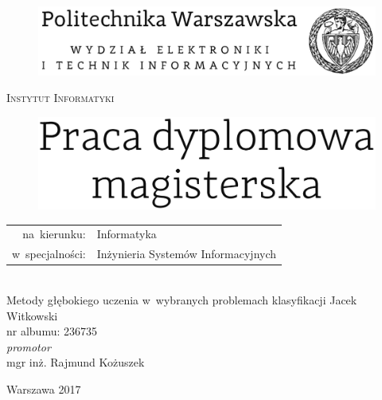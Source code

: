 \documentclass[12pt,a4paper,twoside]{report}
\begin{document}
\begin{titlepage}
  \begin{center}

    \begin{figure}[H]
	\centering
	\includegraphics[width=0.8\linewidth]{img/elka-logo.png}
    \end{figure}


    \textsc{\Large Instytut Informatyki}\\[4.0cm]

    \begin{figure}[H]
	\centering
	\includegraphics[width=0.8\linewidth]{img/pr-dyplomowa-text.png}
    \end{figure}
    \normalsize
    \begin{tabular}{rl}
      na~kierunku:& Informatyka \\
      w~specjalności:& Inżynieria Systemów Informacyjnych
     \end{tabular} \\[1.5cm]

    \Large Metody głębokiego uczenia w~wybranych problemach klasyfikacji
    \vfill
    \Huge Jacek Witkowski \\
    \normalsize nr albumu: 236735 \\[0.5cm]

    \normalsize \textit{promotor}\\
    mgr inż. Rajmund Kożuszek
    \vfill

    {\large Warszawa 2017}

  \end{center}
\end{titlepage}
\raggedbottom
\newpage\thispagestyle{empty}
\end{document}
